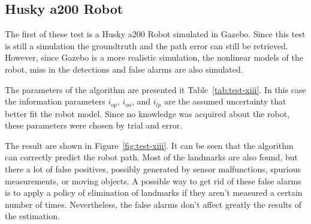\subsection{Husky a200 Robot}

The first of these test is a Husky a200 Robot simulated in Gazebo. Since this test is still a simulation the groundtruth and the path error can still be retrieved. However, since Gazebo is a more realistic simulation, the nonlinear models of the robot, miss in the detections and false alarms are also simulated. 

The parameters of the algorithm are presented it Table~\ref{tab:test-xiii}. In this case the information parameters $i_{op}$, $i_{oa}$, and $i_{lp}$ are the assumed uncertainty that better fit the robot model. Since no knowledge was acquired about the robot, these parameters were chosen by trial and error. 

The result are shown in Figure~\ref{fig:test-xiii}. It can be seen that the algorithm can correctly predict the robot path. Most of the landmarks are also found, but there a lot of false positives, possibly generated by sensor malfunctions, spurious measurements, or moving objects. A possible way to get rid of these false alarms is to apply a policy of elimination of landmarks if they aren't measured a certain number of times. Nevertheless, the false alarms don't affect greatly the results of the estimation.


